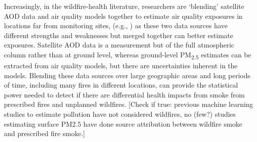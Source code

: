 \documentclass[authoryear]{elsarticle}
\begin{document}
Increasingly, in the wildfire-health literature, researchers are `blending' satellite AOD data and air quality models together to estimate air quality exposures in locations far from monitoring sites, (e.g., \citealt{Reid2016EnvRes,Reid2015,vanDonkelaar2011,Gan2017}) as these two data sources have different strengths and weaknesses but merged together can better estimate exposures. 
Satellite AOD data is a measurement but of the full atmospheric column rather than at ground level, whereas ground-level PM\textsubscript{2.5} estimates can be extracted from air quality models, but there are uncertainties inherent in the models.
Blending these data sources over large geographic areas and long periods of time, including many fires in different locations, can provide the statistical power needed to detect if there are differential health impacts from smoke from prescribed fires and unplanned wildfires.
[Check if true: previous machine learning studies to estimate pollution have not considered wildfires, no (few?) studies estimating surface PM2.5 have done source attribution between wildfire smoke and prescribed fire smoke.]
\end{document}
